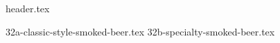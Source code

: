 \clearpage
{}
\divisorLine
{header.tex}
\begin{multicols*}{2}
{32a-classic-style-smoked-beer.tex}
{32b-specialty-smoked-beer.tex}
\end{multicols*}